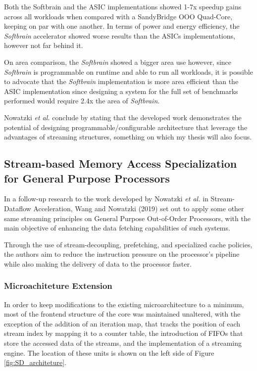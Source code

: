 Both the Softbrain and the ASIC implementations showed 1-7x speedup gains across all workloads when compared with a SandyBridge OOO Quad-Core, keeping on par with one another. In terms of power and energy efficiency, the \textit{Softbrain} accelerator showed worse results than the ASICs implementations, however not far behind it. 

On area comparison, the \textit{Softbrain} showed a bigger area use however, since \textit{Softbrain} is programmable on runtime and able to run all workloads, it is possible to advocate that the \textit{Softbrain} implementation is more area efficient than the ASIC implementation since designing a system for the full set of benchmarks performed would require 2.4x the area of \textit{Softbrain}.

Nowatzki \textit{et al.} \cite{8192490} conclude by stating that the developed work demonstrates the potential of designing programmable/configurable architecture that leverage the advantages of streaming structures, something on which my thesis will also focus.


\subsection{Stream-based Memory Access Specialization for General Purpose Processors}

In a follow-up research to the work developed by Nowatzki \textit{et al.} in Stream-Dataflow Acceleration\cite{8192490}, Wang and Nowatzki (2019) \cite{8980305} set out to apply some other same streaming principles on General Purpose Out-of-Order Processors, with the main objective of enhancing the data fetching capabilities of such systems.

Through the use of stream-decoupling, prefetching, and specialized cache policies, the authors aim to reduce the instruction pressure on the processor's pipeline while also making the delivery of data to the processor faster.

\subsubsection{Microachiteture Extension}
In order to keep modifications to the existing microarchitecture to a minimum, most of the frontend structure of the core was maintained unaltered, with the exception of the addition of an iteration map, that tracks the position of each stream index by mapping it to a counter table, the introduction of FIFOs that store the accessed data of the streams, and the implementation of a streaming engine. The location of these units is shown on the left side of Figure \ref{fig:SD_architeture}.

